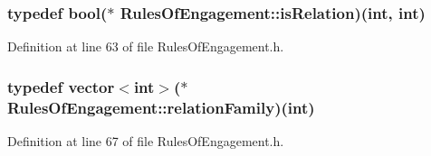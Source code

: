 \hypertarget{class_rules_of_engagement_aad838c0ef69d7c4ee9bef23a431ff6c1}{
\subsubsection[{is\-Relation}]{\setlength{\rightskip}{0pt plus 5cm}typedef bool($\ast$ Rules\-Of\-Engagement\-::is\-Relation)(int, int)}}\label{class_rules_of_engagement_aad838c0ef69d7c4ee9bef23a431ff6c1}


Definition at line 63 of file Rules\-Of\-Engagement.\-h.

\hypertarget{class_rules_of_engagement_a81832aa421c58fe508e3ace862e1288e}{
\subsubsection[{relation\-Family}]{\setlength{\rightskip}{0pt plus 5cm}typedef vector$<$int$>$($\ast$ Rules\-Of\-Engagement\-::relation\-Family)(int)}}\label{class_rules_of_engagement_a81832aa421c58fe508e3ace862e1288e}


Definition at line 67 of file Rules\-Of\-Engagement.\-h.



